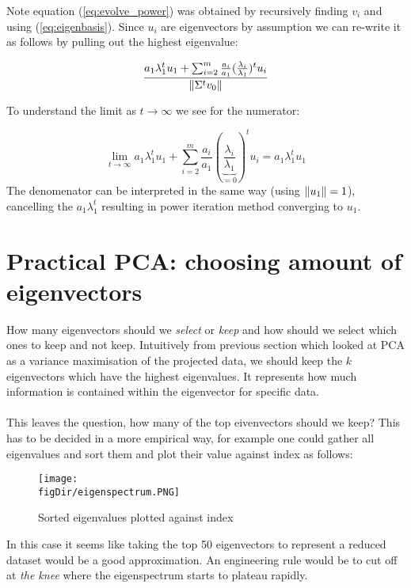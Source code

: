 \noindent 
Note equation (\ref{eq:evolve_power}) was obtained by 
recursively finding $v_i$ and using (\ref{eq:eigenbasis}). 
Since $u_i$ are eigenvectors by assumption we can re-write 
it as follows by pulling out the highest eigenvalue:

\begin{equation}
\frac{a_1\lambda_1^tu_1 
+ \sum_{i=2}^{m}\frac{a_i}{a_1}
(\frac{\lambda_i}{\lambda_1})^t u_i}
{\left\lVert\Sigma^t v_0\right\rVert}
\end{equation}

\noindent
To understand the limit as $t\rightarrow\infty$ we 
see for the numerator:
	
\begin{equation}
\lim_{t\rightarrow\infty}a_1\lambda_1^tu_1 
	+ \sum_{i=2}^{m}\frac{a_i}{a_1}
	(\underbrace{\frac{\lambda_i}{\lambda_1}}_{=0})^t u_i 
	= a_1\lambda_1^tu_1
\end{equation}
The denomenator can be interpreted in the same way 
(using $\left\lVert u_1\right\rVert = 1$), cancelling the $a_1\lambda_1^t$ 
resulting in power iteration method converging to $u_1$.
	
\section{Practical PCA: choosing amount of eigenvectors}
How many eigenvectors should we \textit{select} or \textit{keep}
and how should we select which ones to keep and not keep. 
Intuitively from previous section which looked at PCA as a 
variance maximisation of the projected data, we should keep 
the $k$ eigenvectors which have the highest eigenvalues. It 
represents how much information is contained within the 
eigenvector for specific data.
\\\\
This leaves the question, how many of the top eivenvectors 
should we keep? This has to be decided in a more empirical way, 
for example one could gather all eigenvalues and sort them and 
plot their value against index as follows:
	
\begin{figure}[h!]
\centering
\texttt{[image: \\figDir/eigenspectrum.PNG]}
\label{fig:eigenspectrum}
\caption{Sorted eigenvalues plotted against index}
\end{figure}

\noindent
In this case it seems like taking the top 50 eigenvectors 
to represent a reduced dataset would be a good approximation. 
An engineering rule would be to cut off at \textit{the knee} 
where the eigenspectrum starts to plateau rapidly.
